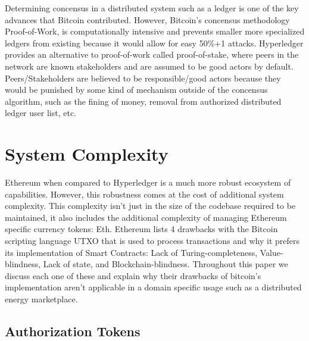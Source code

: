 \documentclass[a4paper,10pt]{article}
\newcommand{\comment}[1]{}  %
\begin{document}
Determining concensus in a distributed system such as a ledger is one of the key advances that Bitcoin\comment{find good citation} contributed. However, Bitcoin's concensus methodology Proof-of-Work, is computationally intensive and prevents smaller more specialized ledgers from existing because it would allow for easy 50\%+1 attacks. Hyperledger provides an alternative to proof-of-work called proof-of-stake, where peers in the network are known stakeholders and are assumed to be good actors by default. Peers/Stakeholders are believed to be responsible/good actors because they would be punished by some kind of mechanism outside of the concensus algorithm, such as the fining of money, removal from authorized distributed ledger user list, etc. 


\section{System Complexity}

Ethereum when compared to Hyperledger is a much more robust ecosystem of capabilities. However, this robustness comes at the cost of additional system complexity. This complexity isn't just in the size of the codebase required to be maintained, it also includes the additional complexity of managing Ethereum specific currency tokens: Eth. Ethereum lists 4 drawbacks with the Bitcoin scripting language UTXO that is used to process transactions and why it prefers its implementation of Smart Contracts: Lack of Turing-completeness, Value-blindness, Lack of state, and Blockchain-blindness\cite{Buterin2014}. Throughout this paper we discuss each one of these and explain why their drawbacks of bitcoin's implementation aren't applicable in a domain specific usage such as a distributed energy marketplace.

\subsection{Authorization Tokens}
\end{document}
